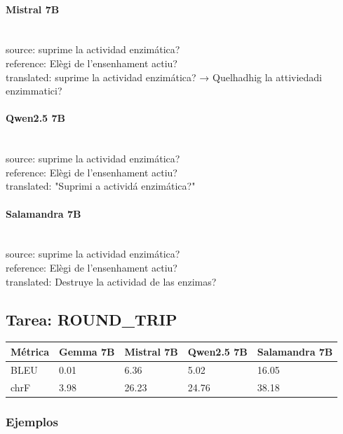 \paragraph{Mistral 7B}~\\
{source:} suprime la actividad enzimática?\\
{reference:} Elègi de l’ensenhament actiu?\\
{translated:} suprime la actividad enzimática? → Quelhadhig la attiviedadi enzimmatici?\\

\paragraph{Qwen2.5 7B}~\\
{source:} suprime la actividad enzimática?\\
{reference:} Elègi de l’ensenhament actiu?\\
{translated:} "Suprimi a actividá enzimática?"\\

\paragraph{Salamandra 7B}~\\
{source:} suprime la actividad enzimática?\\
{reference:} Elègi de l’ensenhament actiu?\\
{translated:} Destruye la actividad de las enzimas?\\

\subsection{Tarea: ROUND\_TRIP}\label{tarea-round_trip}
{\def\LTcaptype{none}
\begin{longtable}[]{@{}lllll@{}}
\toprule\noalign{}
Métrica & Gemma 7B & Mistral 7B & Qwen2.5 7B & Salamandra 7B \\
\midrule\noalign{}
\endhead
\bottomrule\noalign{}
\endlastfoot
BLEU & 0.01 & 6.36 & 5.02 & 16.05 \\
chrF & 3.98 & 26.23 & 24.76 & 38.18 \\
\end{longtable}}

\subsubsection{Ejemplos}

